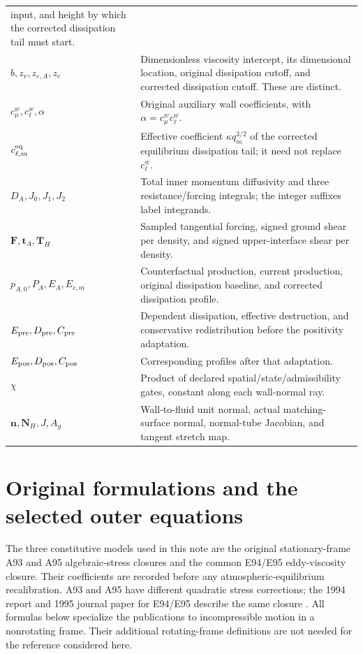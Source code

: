 \documentclass[11pt,a4paper]{article}
\numberwithin{equation}{section}
\newcommand{\eps}{\varepsilon}
\begin{document}
{\begin{longtable}{@{}p{}p{}@{}}
input, and height by which the corrected dissipation tail must start.\\
$b,z_v,z_{\eps,A},z_c$ &
Dimensionless viscosity intercept, its dimensional location, original
dissipation cutoff, and corrected dissipation cutoff. These are distinct.\\
$c_\mu^w,c_\ell^w,\alpha$ &
Original auxiliary wall coefficients, with
$\alpha=c_\mu^wc_\ell^w$.\\
$c_{\ell,m}^{\rm eq}$ &
Effective coefficient $\kappa q_m^{3/2}$ of the corrected equilibrium
dissipation tail; it need not replace $c_\ell^w$.\\
$D_A,J_0,J_1,J_2$ &
Total inner momentum diffusivity and three resistance/forcing integrals;
the integer suffixes label integrands.\\
$\boldsymbol F,\boldsymbol t_A,\boldsymbol T_H$ &
Sampled tangential forcing, signed ground shear per density, and
signed upper-interface shear per density.\\
$p_{A,0},P_A,E_A,E_{c,m}$ &
Counterfactual production, current production, original dissipation
baseline, and corrected dissipation profile.\\
$E_{\rm pre},D_{\rm pre},C_{\rm pre}$ &
Dependent dissipation, effective destruction, and conservative
redistribution before the positivity adaptation.\\
$E_{\rm pos},D_{\rm pos},C_{\rm pos}$ &
Corresponding profiles after that adaptation.\\
$\chi$ &
Product of declared spatial/state/admissibility gates, constant along
each wall-normal ray.\\
$\boldsymbol n,\boldsymbol N_H,J,A_g$ &
Wall-to-fluid unit normal, actual matching-surface normal, normal-tube
Jacobian, and tangent stretch map.\\
\bottomrule
\end{longtable}}



\section{Original formulations and the selected outer equations}
\label{out:models}

The three constitutive models used in this note are the original
stationary-frame A93 and A95 algebraic-stress closures and the common
E94/E95 eddy-viscosity closure. Their coefficients are recorded before
any atmospheric-equilibrium recalibration. A93 and A95 have different
quadratic stress corrections; the 1994 report and 1995 journal paper for
E94/E95 describe the same closure \citep{Shih1993,Shih1995ASM,
Shih1994EVM,Shih1995EVM}. All formulas below specialize the publications
to incompressible motion in a nonrotating frame. Their additional
rotating-frame definitions are not needed for the reference considered
here.
\end{document}

